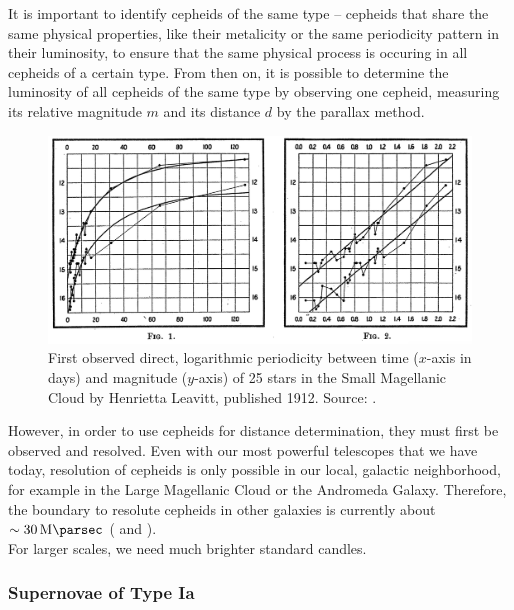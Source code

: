 \noindent It is important to identify cepheids of the same type -- cepheids that share the same physical properties, like their metalicity or the same periodicity pattern in their luminosity, to ensure that the same physical process is occuring in all cepheids of a certain type.
\noindent From then on, it is possible to determine the luminosity of all cepheids of the same type by observing one cepheid, measuring its relative magnitude $m$ and its distance $d$ by the parallax method. \\

\begin{figure}[H]
    \centering
    \includegraphics[scale=0.3]{figures/images/leavitt_period-luminosity.png}
    \caption{First observed direct, logarithmic periodicity between time ($x$-axis in days) and magnitude ($y$-axis) of 25 stars in the Small Magellanic Cloud by Henrietta Leavitt, published 1912. Source: \cite{Leavitt1912}.}
\end{figure}


\noindent However, in order to use cepheids for distance determination, they must first be observed and resolved.
Even with our most powerful telescopes that we have today, resolution of cepheids is only possible in our local, galactic neighborhood, for example in the Large Magellanic Cloud or the Andromeda Galaxy. Therefore, the boundary to resolute cepheids in other galaxies is currently about $\sim \SI{30}{\mega \parsec}$ (\cite[p. 47]{Bartelmann2019} and \cite[p. 3]{Engelmann2013}). \\
For larger scales, we need much brighter standard candles.



\subsubsection{Supernovae of Type Ia}

